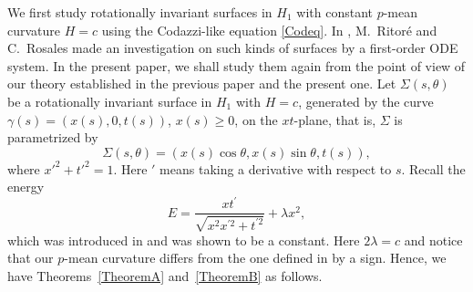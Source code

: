 \documentclass[pdftex]{sigma}
\numberwithin{equation}{section}
\begin{document}
We first study rotationally invariant surfaces in $H_1$ with constant $p$-mean curvature $H=c$ using the Codazzi-like equation \eqref{Codeq}. In \cite{Ritore/Rosales:2006}, M.~Ritor\'{e} and C.~Rosales made an investigation on such kinds of surfaces by a first-order ODE system. In the present paper, we shall study them again from the point of view of our theory established in the previous paper \cite{ChiuH/LiuH:2022} and the present one.
Let $\Sigma(s,\theta)$ be a rotationally invariant surface in $H_1$ with $H=c$, generated by the curve~${\gamma(s)=(x(s),0,t(s))}$, $x(s)\geq 0$, on the $xt$-plane,
that is, $\Sigma$ is parametrized by
\begin{equation*}
\Sigma(s,\theta)=(x(s)\cos \theta,x(s)\sin \theta,t(s)),
\end{equation*}
where $x'^{2}+t'^{2}=1$. Here $'$ means taking a derivative with respect to $s$. Recall the energy
\begin{equation}\label{energy1}
E=\frac{xt^{\prime }}{\sqrt{x^2x^{\prime 2}+t^{\prime 2}}}+\lambda x^2,
\end{equation}
which was introduced in \cite{Ritore/Rosales:2006} and was shown to be a constant. Here $2\lambda=c$ and notice that our $p$-mean curvature differs from the one defined in \cite{Ritore/Rosales:2006} by a sign. Hence, we have Theorems~\ref{TheoremA} and~\ref{TheoremB} as follows.
\end{document}
